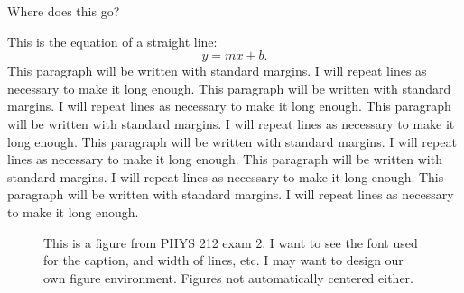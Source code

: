 \documentclass[numbib]{buthesis}  %
\begin{document}
Where does this go?

This is the equation of a straight line:
\begin{equation}
y = mx + b.
\end{equation}
This paragraph will be written with standard margins. I will repeat
lines as necessary to make it long enough. This paragraph will be
written with standard margins. I will repeat lines as necessary to
make it long enough. This paragraph will be written with standard
margins. I will repeat lines as necessary to make it long enough.
This paragraph will be written with standard margins. I will repeat
lines as necessary to make it long enough. This paragraph will be
written with standard margins. I will repeat lines as necessary to
make it long enough. This paragraph will be written with standard
margins. I will repeat lines as necessary to make it long enough.

\begin{figure}[t]
\begin{center}
\end{center}
\caption[Short caption for figure]{This is a figure from PHYS 212 exam 2.  I
want to see the font used for the caption, and width of lines, etc. I
may want to design our own figure environment.  Figures not
automatically centered either.}
\label{f_speaker}
\end{figure}
\end{document}

